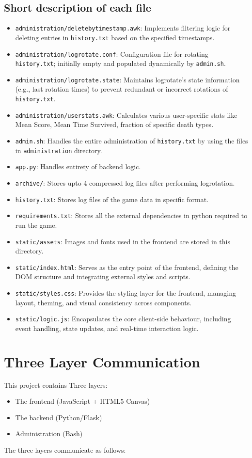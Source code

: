 \documentclass{article}
\begin{document}
\subsection{Short description of each file}
\begin{itemize}
    \item \verb|administration/deletebytimestamp.awk|: Implements filtering logic for deleting entries in \verb|history.txt| based on the specified timestamps.
    \item \verb|administration/logrotate.conf|: Configuration file for rotating \texttt{history.txt}; initially empty and populated dynamically by \texttt{admin.sh}.
    \item \verb|administration/logrotate.state|: Maintains logrotate’s state information (e.g., last rotation times) to prevent redundant or incorrect rotations of \texttt{history.txt}.
    \item \verb|administration/userstats.awk|: Calculates various user-specific stats like Mean Score, Mean Time Survived, fraction of specific death types.
    \item \verb|admin.sh|: Handles the entire administration of \texttt{history.txt} by using the files in \texttt{administration} directory.
    \item \verb|app.py|: Handles entirety of backend logic.
    \item \verb|archive/|: Stores upto 4 compressed log files after performing logrotation.
    \item \verb|history.txt|: Stores log files of the game data in specific format.
    \item \verb|requirements.txt|: Stores all the external dependencies in python required to run the game.
    \item \verb|static/assets|: Images and fonts used in the frontend are stored in this directory.
    \item \verb|static/index.html|: Serves as the entry point of the frontend, defining the DOM structure and integrating external styles and scripts.
    \item \verb|static/styles.css|: Provides the styling layer for the frontend, managing layout, theming, and visual consistency across components.
    \item \verb|static/logic.js|: Encapsulates the core client-side behaviour, including event handling, state updates, and real-time interaction logic.
\end{itemize}
\section{Three Layer Communication}
This project contains Three layers:
\begin{itemize}
    \item The frontend (JavaScript + HTML5 Canvas)
    \item The backend (Python/Flask)
    \item Administration (Bash)
\end{itemize}
The three layers communicate as follows:
\end{document}
